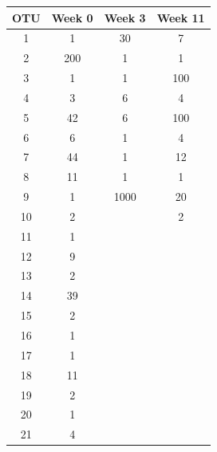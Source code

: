 \documentclass[twocolumn]{article}
\begin{document}
\begin{center}
\begin{tabular}{|c|c|c|c|}
\hline
\textbf{OTU} & \textbf{Week 0} & \textbf{Week 3} & \textbf{Week 11} \\ \hline
1             & 1               & 30              & 7                \\ \hline
2             & 200             & 1               & 1                \\ \hline
3             & 1               & 1               & 100              \\ \hline
4             & 3               & 6               & 4                \\ \hline
5             & 42              & 6               & 100              \\ \hline
6             & 6               & 1               & 4                \\ \hline
7             & 44              & 1               & 12               \\ \hline
8             & 11              & 1               & 1                \\ \hline
9             & 1               & 1000            & 20               \\ \hline
10            & 2               &                 & 2                \\ \hline
11            & 1               &                 &                  \\ \hline
12            & 9               &                 &                  \\ \hline
13            & 2               &                 &                  \\ \hline
14            & 39              &                 &                  \\ \hline
15            & 2               &                 &                  \\ \hline
16            & 1               &                 &                  \\ \hline
17            & 1               &                 &                  \\ \hline
18            & 11              &                 &                  \\ \hline
19            & 2               &                 &                  \\ \hline
20            & 1               &                 &                  \\ \hline
21            & 4               &                 &                  \\ \hline
\end{tabular}
\end{center}
\end{document}
